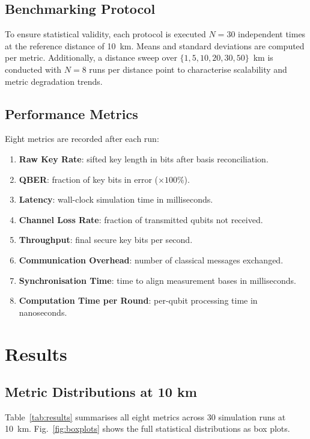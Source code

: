 \documentclass[conference]{IEEEtran}
\begin{document}
\subsection{Benchmarking Protocol}

To ensure statistical validity, each protocol is executed $N=30$ independent
times at the reference distance of 10~km. Means and standard deviations are
computed per metric. Additionally, a distance sweep over $\{1, 5, 10, 20, 30,
50\}$~km is conducted with $N=8$ runs per distance point to characterise
scalability and metric degradation trends.

\subsection{Performance Metrics}

Eight metrics are recorded after each run:

\begin{enumerate}
  \item \textbf{Raw Key Rate}: sifted key length in bits after basis reconciliation.
  \item \textbf{QBER}: fraction of key bits in error ($\times 100\%$).
  \item \textbf{Latency}: wall-clock simulation time in milliseconds.
  \item \textbf{Channel Loss Rate}: fraction of transmitted qubits not received.
  \item \textbf{Throughput}: final secure key bits per second.
  \item \textbf{Communication Overhead}: number of classical messages exchanged.
  \item \textbf{Synchronisation Time}: time to align measurement bases in milliseconds.
  \item \textbf{Computation Time per Round}: per-qubit processing time in nanoseconds.
\end{enumerate}

\section{Results}

\subsection{Metric Distributions at 10 km}

Table~\ref{tab:results} summarises all eight metrics across 30 simulation
runs at 10~km. Fig.~\ref{fig:boxplots} shows the full statistical
distributions as box plots.
\end{document}
